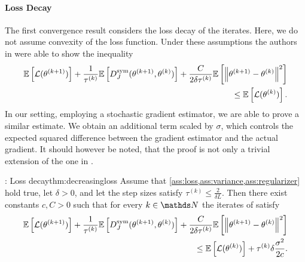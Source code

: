 \paragraph{Loss Decay}
The first convergence result considers the loss decay of the iterates. Here, we do not assume convexity of the loss function. Under these assumptions the authors in \cite{benning2018choose, benning2018modern} were able to show the inequality
%
\begin{align*}
\begin{split}
\mathbb{E}\left[\mathcal{L}(\theta^{(k+1)})\right] + \frac{1}{\tau^{(k)}}\mathbb{E}\left[ D^\mathrm{sym}_J(\theta^{(k+1)},\theta^{(k)})\right] + \frac{C}{2\delta\tau^{(k)}}\mathbb{E}\left[\left\|\theta^{(k+1)}-\theta^{(k)}\right\|^2\right] \\
\leq \mathbb{E}\left[\mathcal{L}(\theta^{(k)})\right].
\end{split}
\end{align*}
%
%
In our setting, employing a stochastic gradient estimator, we are able to prove a similar estimate. We obtain an additional term scaled by $\sigma$, which controls the expected squared difference between the gradient estimator and the actual gradient. It should however be noted, that the proof is not only a trivial extension of the one in \cite{benning2018modern}.
%
%
\begin{theorem}{\cite[Thm. 2]{bungert2022bregman}: Loss decay}{thm:decreasingloss}
Assume that \cref{ass:loss,ass:variance,ass:regularizer} hold true, let $\delta>0$, and let the step sizes satisfy $\tau^{(k)} \leq \frac{2}{\delta L}$.
Then there exist constants $c,C>0$ such that for every $k\in\N$ the iterates of  satisfy 
\begin{align}\label{ineq:loss_decay}
    \begin{split}
    \mathbb{E}\left[\mathcal{L}(\theta^{(k+1)})\right] + \frac{1}{\tau^{(k)}}\mathbb{E}\left[ D^\mathrm{sym}_J(\theta^{(k+1)},\theta^{(k)})\right] + \frac{C}{2\delta\tau^{(k)}}\mathbb{E}\left[\left\|\theta^{(k+1)}-\theta^{(k)}\right\|^2\right] \\
    \leq \mathbb{E}\left[\mathcal{L}(\theta^{(k)})\right] + \tau^{(k)}\delta\frac{\sigma^2}{2c}.
    \end{split}
\end{align}
\end{theorem}


